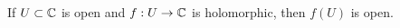 \documentclass{homework}
\begin{document}
                                                                                                                                                                                                            \begin{problem}\label{open-mapping-theorem}If $U \subset \mathbb{C}$ is open
                                                                                                                                                                                                              and $f : U \to \mathbb{C}$ is holomorphic, then $f(U)$ is
                                                                                                                                                                                                                open. %
                                                                                                                                                                                                                \end{problem}
\end{document}
